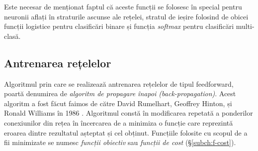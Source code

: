 Este necesar de menționat faptul că aceste funcții se folosesc în special pentru neuronii aflați în straturile ascunse ale rețelei, stratul de ieșire folosind de obicei funcții logistice pentru clasificări binare și funcția \textit{softmax} pentru clasificări multi-clasă.

\subsection{Antrenarea rețelelor}
Algoritmul prin care se realizează antrenarea rețelelor de tipul feedforward, poartă denumirea de \textit{algoritm de propagare înapoi (back-propagation)}. Acest algoritm a fost făcut faimos de către David Rumelhart, Geoffrey Hinton, și Ronald Williams în 1986 \cite{Rumelhart1986}. Algoritmul constă în modificarea repetată a ponderilor conexiunilor din rețea în încercarea de a minimiza o funcție care reprezintă eroarea dintre rezultatul așteptat și cel obținut. Funcțiile folosite cu scopul de a fii minimizate se numesc \textit{funcții obiectiv} sau \textit{funcții de cost} (\S\ref{subch:f-cost}).


